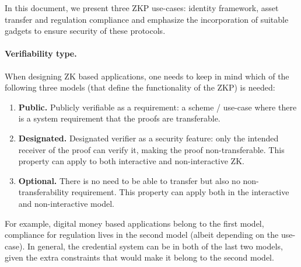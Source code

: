 In this document, we present three ZKP use-cases: identity framework, asset transfer and regulation compliance and emphasize the incorporation of suitable gadgets to ensure security of these protocols.  



\paragraph{Verifiability type.}

When designing ZK based applications, one needs to keep in mind which of the following three models (that define the functionality of the ZKP) is needed:

\begin{enumerate}

    \item \textbf{Public.}
		Publicly verifiable as a requirement: a scheme / use-case where 
	there is a system requirement that
	the proofs are transferable. %
		
    \item \textbf{Designated.} 
		Designated verifier as a security feature: only the intended receiver of the proof can verify it, making the proof non-transferable. 
		This property can apply to both interactive and non-interactive ZK.
		
    \item \textbf{Optional.} %
		There is no need to be able to transfer but also no non-transferability requirement. %
		This property %
	can apply both in the interactive and non-interactive model.

\end{enumerate}

For example, digital money based applications belong to the first model, compliance for regulation lives in the second model (albeit depending on the use-case). In general, the credential system can be in both of the last two models, given the extra constraints that would make it belong to the second model.



